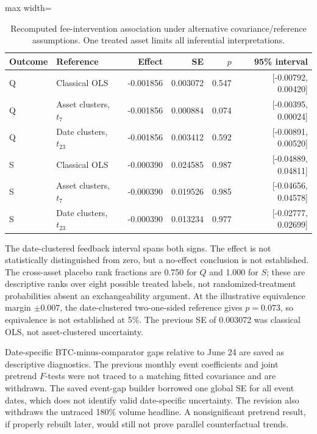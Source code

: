 \documentclass[12pt]{article}
\theoremstyle{definition}
\theoremstyle{remark}
\begin{document}
\begin{table}[htbp]
\centering\small
\caption{Recomputed fee-intervention association under alternative covariance/reference assumptions. One treated asset limits all inferential interpretations.}
\label{tab:fee_revised}
\begin{adjustbox}{max width=\textwidth}
\begin{tabular}{llrrrr}\toprule
Outcome & Reference & Effect & SE & $p$ & 95\% interval \\\midrule
Q & Classical OLS & -0.001856 & 0.003072 & 0.547 & [-0.00792, 0.00420] \\
Q & Asset clusters, $t_7$ & -0.001856 & 0.000884 & 0.074 & [-0.00395, 0.00024] \\
Q & Date clusters, $t_{23}$ & -0.001856 & 0.003412 & 0.592 & [-0.00891, 0.00520] \\
S & Classical OLS & -0.000390 & 0.024585 & 0.987 & [-0.04889, 0.04811] \\
S & Asset clusters, $t_7$ & -0.000390 & 0.019526 & 0.985 & [-0.04656, 0.04578] \\
S & Date clusters, $t_{23}$ & -0.000390 & 0.013234 & 0.977 & [-0.02777, 0.02699] \\
\bottomrule\end{tabular}
\end{adjustbox}
\end{table}

The date-clustered feedback interval spans both signs. The effect is not statistically distinguished from zero, but a no-effect conclusion is not established. The cross-asset placebo rank fractions are 0.750 for $Q$ and 1.000 for $S$; these are descriptive ranks over eight possible treated labels, not randomized-treatment probabilities absent an exchangeability argument. At the illustrative equivalence margin $\pm0.007$, the date-clustered two-one-sided reference gives $p=0.073$, so equivalence is not established at 5\%. The previous SE of 0.003072 was classical OLS, not asset-clustered uncertainty.

Date-specific BTC-minus-comparator gaps relative to June 24 are saved as descriptive diagnostics. The previous monthly event coefficients and joint pretrend $F$-tests were not traced to a matching fitted covariance and are withdrawn. The saved event-gap builder borrowed one global SE for all event dates, which does not identify valid date-specific uncertainty. The revision also withdraws the untraced 180\% volume headline. A nonsignificant pretrend result, if properly rebuilt later, would still not prove parallel counterfactual trends.
\end{document}
